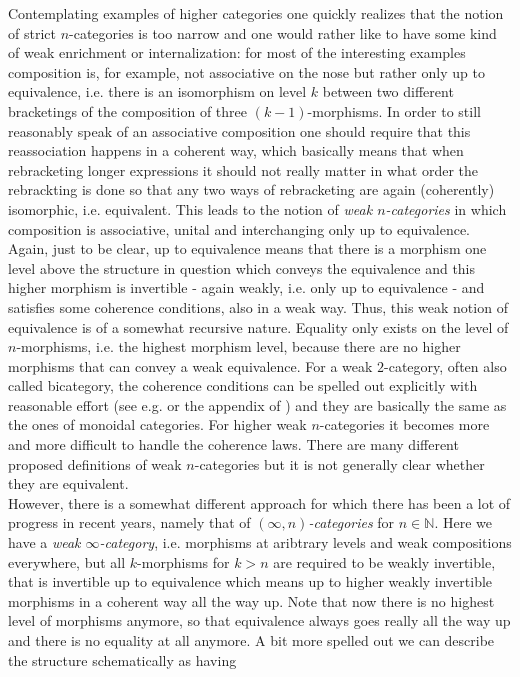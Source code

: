 Contemplating examples of higher categories one quickly realizes that the notion of strict $n$-categories is too narrow and one would rather like to have some kind of weak enrichment or internalization: for most of the interesting examples composition is, for example, not associative on the nose but rather only up to equivalence, i.e. there is an isomorphism on level $k$ between two different bracketings of the composition of three $(k-1)$-morphisms. In order to still reasonably speak of an associative composition one should require that this reassociation happens in a coherent way, which basically means that when rebracketing longer expressions it should not really matter in what order the rebrackting is done so that any two ways of rebracketing are again (coherently) isomorphic, i.e. equivalent. This leads to the notion of \textit{weak $n$-categories} in which composition is associative, unital and interchanging only up to equivalence. Again, just to be clear, {\glqq}up to equivalence{\grqq} means that there is a morphism one level above the structure in question which conveys the equivalence and this higher morphism is invertible - again weakly, i.e. only up to equivalence - and satisfies some coherence conditions, also in a weak way. Thus, this weak notion of equivalence is of a somewhat recursive nature. Equality only exists on the level of $n$-morphisms, i.e. the highest morphism level, because there are no higher morphisms that can convey a weak equivalence. For a weak $2$-category, often also called bicategory, the coherence conditions can be spelled out explicitly with reasonable effort (see e.g. \cite{00000001} or the appendix of \cite{d37d0fca}) and they are basically the same as the ones of monoidal categories. For higher weak $n$-categories it becomes more and more difficult to handle the coherence laws. There are many different proposed definitions of weak $n$-categories but it is not generally clear whether they are equivalent.
\\
However, there is a somewhat different approach for which there has been a lot of progress in recent years, namely that of \textit{$(\infty,n)$-categories} for $n \in \mathbb{N}$. Here we have a \textit{weak $\infty$-category}, i.e. morphisms at aribtrary levels and weak compositions everywhere, but all $k$-morphisms for $k > n$ are required to be weakly invertible, that is invertible up to equivalence which means up to higher weakly invertible morphisms in a coherent way all the way up. Note that now there is no highest level of morphisms anymore, so that equivalence always goes really all the way up and there is no equality at all anymore. A bit more spelled out we can describe the structure schematically as having
